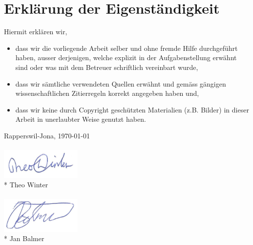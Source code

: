 \chapter*{Erklärung der Eigenständigkeit}

Hiermit erklären wir,

\begin{itemize}
\item dass wir die vorliegende Arbeit selber und ohne fremde Hilfe durchgeführt haben, ausser derjenigen, welche explizit in der Aufgabenstellung erwähnt sind oder was mit dem Betreuer schriftlich vereinbart wurde,

\item dass wir sämtliche verwendeten Quellen erwähnt und gemäss gängigen wissenschaftlichen Zitierregeln korrekt angegeben haben und,

\item dass wir keine durch Copyright geschützten Materialien (z.B. Bilder) in dieser Arbeit in unerlaubter Weise genutzt haben.
\end{itemize}


Rapperswil-Jona, \today
\\
\\
\includegraphics[width=4cm]{start/img/Unterschrift_twinter} \\*
Theo Winter
\\
\\
\includegraphics[width=4cm]{start/img/Unterschrift_jbalmer} \\*
Jan Balmer